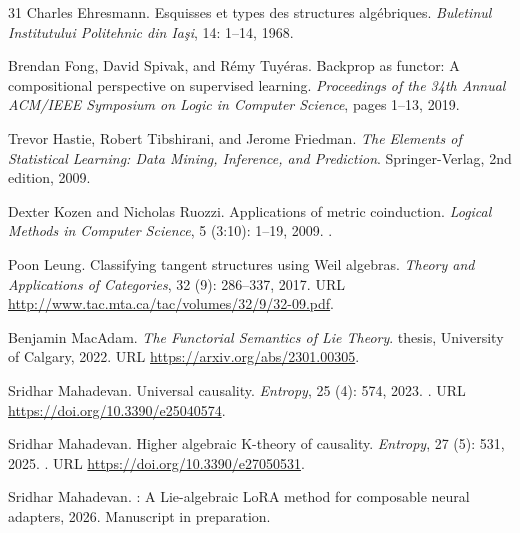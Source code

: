 \documentclass{article}
\begin{document}
\begin{thebibliography}{31}
Charles Ehresmann.
\newblock Esquisses et types des structures alg{\'e}briques.
\newblock \emph{Buletinul Institutului Politehnic din Ia{\c s}i}, 14: 1--14, 1968.

Brendan Fong, David Spivak, and R{\'e}my Tuy{\'e}ras.
\newblock Backprop as functor: A compositional perspective on supervised learning.
\newblock \emph{Proceedings of the 34th Annual ACM/IEEE Symposium on Logic in Computer Science}, pages 1--13, 2019.

Trevor Hastie, Robert Tibshirani, and Jerome Friedman.
\newblock \emph{The Elements of Statistical Learning: Data Mining, Inference, and Prediction}.
\newblock Springer-Verlag, 2nd edition, 2009.

Dexter Kozen and Nicholas Ruozzi.
\newblock Applications of metric coinduction.
\newblock \emph{Logical Methods in Computer Science}, 5 (3:10): 1--19, 2009.
\newblock {}.

Poon Leung.
\newblock Classifying tangent structures using {Weil} algebras.
\newblock \emph{Theory and Applications of Categories}, 32 (9): 286--337, 2017.
\newblock URL \url{http://www.tac.mta.ca/tac/volumes/32/9/32-09.pdf}.

Benjamin MacAdam.
\newblock \emph{The Functorial Semantics of Lie Theory}.
 thesis, University of Calgary, 2022.
\newblock URL \url{https://arxiv.org/abs/2301.00305}.

Sridhar Mahadevan.
\newblock Universal causality.
\newblock \emph{Entropy}, 25 (4): 574, 2023.
\newblock {}.
\newblock URL \url{https://doi.org/10.3390/e25040574}.

Sridhar Mahadevan.
\newblock Higher algebraic {K}-theory of causality.
\newblock \emph{Entropy}, 27 (5): 531, 2025.
\newblock {}.
\newblock URL \url{https://doi.org/10.3390/e27050531}.

Sridhar Mahadevan.
: A {Lie}-algebraic {LoRA} method for composable neural adapters, 2026{}.
\newblock Manuscript in preparation.


\end{thebibliography}
\end{document}
